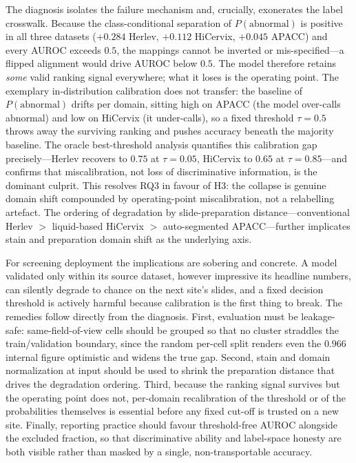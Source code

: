 \documentclass[twocolumn]{article}
\begin{document}
The diagnosis isolates the failure mechanism and, crucially, exonerates the label crosswalk. Because the class-conditional separation of $P(\text{abnormal})$ is positive in all three datasets ($+0.284$ Herlev, $+0.112$ HiCervix, $+0.045$ APACC) and every AUROC exceeds $0.5$, the mappings cannot be inverted or mis-specified---a flipped alignment would drive AUROC below $0.5$. The model therefore retains \emph{some} valid ranking signal everywhere; what it loses is the operating point. The exemplary in-distribution calibration does not transfer: the baseline of $P(\text{abnormal})$ drifts per domain, sitting high on APACC (the model over-calls abnormal) and low on HiCervix (it under-calls), so a fixed threshold $\tau=0.5$ throws away the surviving ranking and pushes accuracy beneath the majority baseline. The oracle best-threshold analysis quantifies this calibration gap precisely---Herlev recovers to $0.75$ at $\tau=0.05$, HiCervix to $0.65$ at $\tau=0.85$---and confirms that miscalibration, not loss of discriminative information, is the dominant culprit. This resolves RQ3 in favour of H3: the collapse is genuine domain shift compounded by operating-point miscalibration, not a relabelling artefact. The ordering of degradation by slide-preparation distance---conventional Herlev $>$ liquid-based HiCervix $>$ auto-segmented APACC---further implicates stain and preparation domain shift as the underlying axis.

For screening deployment the implications are sobering and concrete. A model validated only within its source dataset, however impressive its headline numbers, can silently degrade to chance on the next site's slides, and a fixed decision threshold is actively harmful because calibration is the first thing to break. The remedies follow directly from the diagnosis. First, evaluation must be leakage-safe: same-field-of-view cells should be grouped so that no cluster straddles the train/validation boundary, since the random per-cell split renders even the $0.966$ internal figure optimistic and widens the true gap. Second, stain and domain normalization at input \citep{macenko2009stain} should be used to shrink the preparation distance that drives the degradation ordering. Third, because the ranking signal survives but the operating point does not, per-domain recalibration of the threshold or of the probabilities themselves \citep{guo2017calibration} is essential before any fixed cut-off is trusted on a new site. Finally, reporting practice should favour threshold-free AUROC alongside the excluded fraction, so that discriminative ability and label-space honesty are both visible rather than masked by a single, non-transportable accuracy.
\end{document}
